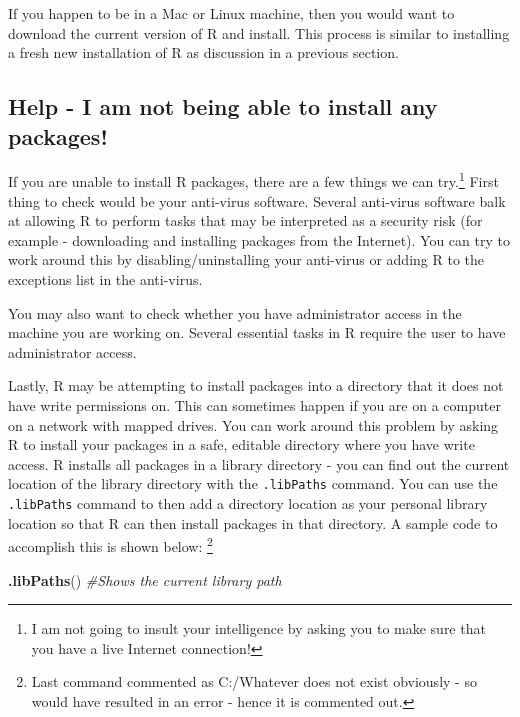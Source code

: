 \documentclass[]{krantz}
\makeatletter
\newenvironment{Shaded}{\begin{snugshade}}{\end{snugshade}}
\newcommand{\KeywordTok}[1]{\textcolor[rgb]{0.27,0.27,0.27}{\textbf{#1}}}
\newcommand{\CommentTok}[1]{\textcolor[rgb]{0.37,0.37,0.37}{\textit{#1}}}
\newcommand{\NormalTok}[1]{#1}
\newenvironment{kframe}{%
\medskip{}
\setlength{\fboxsep}{.8em}
 \def\at@end@of@kframe{}%
 \ifinner\ifhmode%
  \def\at@end@of@kframe{\end{minipage}}%
  \begin{minipage}{\columnwidth}%
 \fi\fi%
 \def\FrameCommand##1{\hskip\@totalleftmargin \hskip-\fboxsep
 \colorbox{shadecolor}{##1}\hskip-\fboxsep
     \hskip-\linewidth \hskip-\@totalleftmargin \hskip\columnwidth}%
 \MakeFramed {\advance\hsize-\width
   \@totalleftmargin\z@ \linewidth\hsize
   \@setminipage}}%
 {\par\unskip\endMakeFramed%
 \at@end@of@kframe}
\renewenvironment{Shaded}{\begin{kframe}}{\end{kframe}}
\makeatother
\begin{document}
If you happen to be in a Mac or Linux machine, then you would want to
download the current version of R and install. This process is similar
to installing a fresh new installation of R as discussion in a previous
section.

\subsection{Help - I am not being able to install any
packages!}\label{help---i-am-not-being-able-to-install-any-packages}

If you are unable to install R packages, there are a few things we can
try.\footnote{I am not going to insult your intelligence by asking you
  to make sure that you have a live Internet connection!} First thing to
check would be your anti-virus software. Several anti-virus software
balk at allowing R to perform tasks that may be interpreted as a
security risk (for example - downloading and installing packages from
the Internet). You can try to work around this by disabling/uninstalling
your anti-virus or adding R to the exceptions list in the anti-virus.

You may also want to check whether you have administrator access in the
machine you are working on. Several essential tasks in R require the
user to have administrator access.

Lastly, R may be attempting to install packages into a directory that it
does not have write permissions on. This can sometimes happen if you are
on a computer on a network with mapped drives. You can work around this
problem by asking R to install your packages in a safe, editable
directory where you have write access. R installs all packages in a
library directory - you can find out the current location of the library
directory with the \texttt{.libPaths} command. You can use the
\texttt{.libPaths} command to then add a directory location as your
personal library location so that R can then install packages in that
directory. A sample code to accomplish this is shown below: \footnote{Last
  command commented as C:/Whatever does not exist obviously - so would
  have resulted in an error - hence it is commented out.}

\begin{Shaded}
\begin{Highlighting}[]
\KeywordTok{.libPaths}\NormalTok{() }\CommentTok{#Shows the current library path}
\end{Highlighting}
\end{Shaded}
\end{document}
